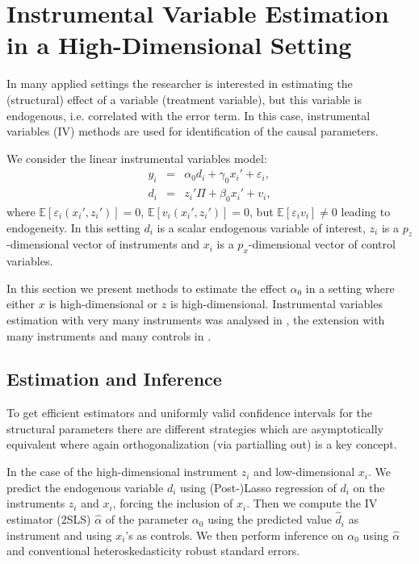 \documentclass{amsart}\usepackage[]{graphicx}\usepackage[]{color}
\begin{document}
\section{Instrumental Variable Estimation in a High-Dimensional Setting}

In many applied settings the researcher is interested in estimating the (structural) effect of a variable (treatment variable), but this variable is endogenous, i.e. correlated with the error term. In this case, instrumental variables (IV) methods are used for identification of the causal parameters.

We consider the linear instrumental variables model:
\begin{eqnarray}
y_i &=& \alpha_0 d_i + \gamma_0 x_i' + \varepsilon_i,\\
d_i &=& z_i' \Pi + \beta_0 x_i' + v_i,
\end{eqnarray}
where $\mathbb{E}[\varepsilon_i (x_i', z_i')]= 0$, $\mathbb{E}[v_i (x_i', z_i')]=0$, but $\mathbb{E}[\varepsilon_i v_i] \neq 0$ leading to endogeneity. In this setting $d_i$ is a scalar endogenous variable of interest, $z_i$ is a $p_z$-dimensional vector of instruments and $x_i$ is a $p_x$-dimensional vector of control variables.

In this section we present methods to estimate the effect $\alpha_0$ in a setting where either $x$ is high-dimensional or $z$ is high-dimensional. Instrumental variables estimation with very many instruments was analysed in \citet{BCCH12}, the extension with many instruments and many controls in \citet{CHS:ManyIVNote}.

\subsection{Estimation and Inference}

To get efficient estimators and uniformly valid confidence intervals for the structural parameters there are different strategies which are asymptotically equivalent where again orthogonalization (via partialling out) is a key concept.

In the case of the high-dimensional instrument $z_i$
and low-dimensional $x_i$. We predict the endogenous variable $d_i$ using (Post-)Lasso regression of $d_i$ on the instruments $z_i$ and $x_i$, forcing the inclusion of $x_i$. Then we compute the IV estimator (2SLS) $\hat \alpha$ of the parameter $\alpha_0$ using the predicted value $\hat d_i$ as instrument and using $x_i$'s as controls.   We then perform inference on $\alpha_0$ using $\hat \alpha$ and conventional heteroskedasticity robust standard errors.
\end{document}
